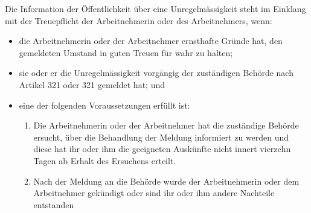 Die Information der Öffentlichkeit über eine Unregelmässigkeit steht im Einklang
mit der Treuepflicht der Arbeitnehmerin oder des Arbeitnehmers, wenn:
\begin{itemize}
	\tightlist
	\item die Arbeitnehmerin oder der Arbeitnehmer ernsthafte Gründe hat, den
	gemeldeten Umstand in guten Treuen für wahr zu halten;
	\item sie oder er die Unregelmässigkeit vorgängig der zuständigen Behörde
	nach Artikel 321 oder 321 gemeldet hat; und
	\item eine der folgenden Voraussetzungen erfüllt ist:
	\begin{enumerate}
		\tightlist
		\item Die Arbeitnehmerin oder der Arbeitnehmer hat die zuständige
		Behörde ersucht, über die Behandlung der Meldung informiert zu werden
		und diese hat ihr oder ihm die geeigneten Auskünfte nicht innert
		vierzehn Tagen ab Erhalt des Ersuchens erteilt.
		\item Nach der Meldung an die Behörde wurde der Arbeitnehmerin oder dem
		Arbeitnehmer gekündigt oder sind ihr oder ihm andere Nachteile entstanden
	\end{enumerate}
\end{itemize}
